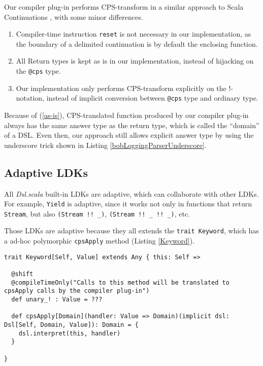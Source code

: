 Our compiler plug-in performs CPS-transform in a similar approach to Scala Continuations \cite{rompf2009implementing}, with some minor differences.

\begin{enumerate}
  
  \item Compiler-time instruction \lstinline{reset} is not necessary in our implementation, as the boundary of a delimited continuation is by default the enclosing function.
  
  \item All Return types is kept as is in our implementation, instead of hijacking on the \lstinline{@cps} type.
  \label{as-is}

  \item Our implementation only performs CPS-transform explicitly on the !-notation, instead of implicit conversion between \lstinline{@cps} type and ordinary type.

\end{enumerate}

Because of (\ref{as-is}), CPS-translated function produced by our compiler plug-in always has the same answer type as the return type, which is called the ``domain'' of a DSL. Even then, our approach still allows explicit answer type by using the underscore trick shown in Listing \ref{bobLoggingParserUnderscore}.

\subsection{Adaptive LDKs}

All \textit{Dsl.scala} built-in LDKs are adaptive, which can collaborate with other LDKs. For example, \lstinline{Yield} is adaptive, since it works not only in functions that return \lstinline{Stream}, but also \lstinline{(Stream !! _)}, \lstinline{(Stream !! _ !! _)}, etc. 

Those LDKs are adaptive because they all extends the \lstinline{trait Keyword}, which has a ad-hoc polymorphic \lstinline{cpsApply} method (Listing \ref{Keyword}).

\begin{lstlisting}[caption={The ad-hoc polymorphism in \lstinline{Keyword}},label={Keyword}]
trait Keyword[Self, Value] extends Any { this: Self =>

  @shift
  @compileTimeOnly("Calls to this method will be translated to cpsApply calls by the compiler plug-in")
  def unary_! : Value = ???

  def cpsApply[Domain](handler: Value => Domain)(implicit dsl: Dsl[Self, Domain, Value]): Domain = {
    dsl.interpret(this, handler)
  }

}
\end{lstlisting}

